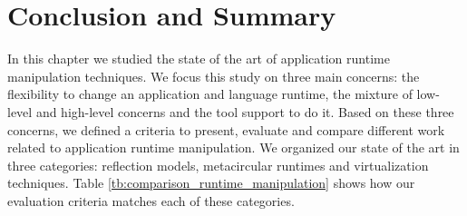 


\section{Conclusion and Summary}

In this chapter we studied the state of the art of application runtime manipulation techniques. We focus this study on three main concerns: the flexibility to change an application and language runtime, the mixture of low-level and high-level concerns and the tool support to do it. Based on these three concerns, we defined a criteria to present, evaluate and compare different work related to application runtime manipulation. We organized our state of the art in three categories: reflection models, metacircular runtimes and virtualization techniques. Table \ref{tb:comparison_runtime_manipulation} shows how our evaluation criteria matches each of these categories.

